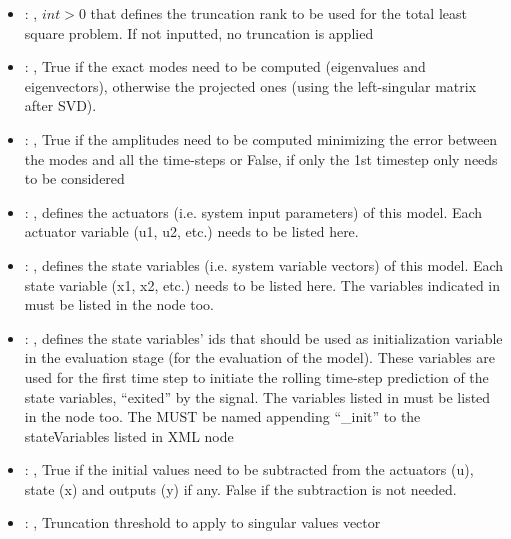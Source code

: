 \begin{itemize}
    \item {}: ,
      $int > 0$ that defines the truncation rank to be used for the total
      least square problem. If not inputted, no truncation is applied

    \item {}: ,
      True if the exact modes need to be computed (eigenvalues and
      eigenvectors),   otherwise the projected ones (using the left-singular matrix after SVD).

    \item {}: ,
      True if the amplitudes need to be computed minimizing the error
      between the modes and all the time-steps or False, if only the 1st timestep only needs to be
      considered

    \item {}: ,
      defines the actuators (i.e. system input parameters)
      of this model. Each actuator variable (u1, u2, etc.) needs to
      be listed here.

    \item {}: ,
      defines the state variables (i.e. system variable vectors)
      of this model. Each state variable (x1, x2, etc.) needs to be listed
      here. The variables indicated in  must be
      listed in the  node too.

    \item {}: ,
      defines the state variables' ids  that should be used as
      initialization variable                                                   in the evaluation
      stage (for the evaluation of the model).
      These variables are used for the first time step to initiate
      the rolling time-step prediction of the state variables, ``exited''
      by the  signal. The variables listed in
       must be listed in the  
      node too.                                                   \nb The
       MUST be named appending ``\_init'' to
      the stateVariables listed in  XML node

    \item {}: ,
      True if the initial values need to be subtracted from the
      actuators (u), state (x) and outputs (y) if any. False if the subtraction
      is not needed.

    \item {}: ,
      Truncation threshold to apply to singular values vector
  \end{itemize}

